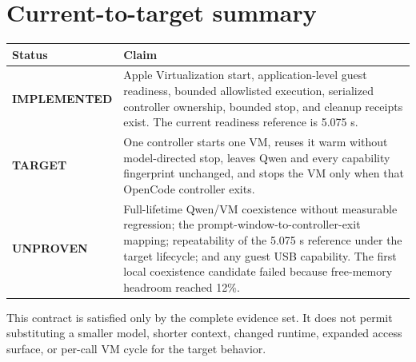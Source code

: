 \documentclass[10pt]{article}
\newcommand{\Implemented}{\textcolor{implemented}{\textbf{IMPLEMENTED}}}
\newcommand{\Target}{\textcolor{target}{\textbf{TARGET}}}
\newcommand{\Unproven}{\textcolor{unproven}{\textbf{UNPROVEN}}}
\begin{document}
\section{Current-to-target summary}

\begin{center}
\begin{tabularx}{\linewidth}{@{}l X@{}}
\toprule
Status & Claim \\
\midrule
\Implemented & Apple Virtualization start, application-level guest readiness,
bounded allowlisted execution, serialized controller ownership, bounded stop,
and cleanup receipts exist.  The current readiness reference is 5.075 s. \\
\Target & One controller starts one VM, reuses it warm without model-directed
stop, leaves Qwen and every capability fingerprint unchanged, and stops the VM
only when that OpenCode controller exits. \\
\Unproven & Full-lifetime Qwen/VM coexistence without measurable regression;
the prompt-window-to-controller-exit mapping; repeatability of the 5.075 s
reference under the target lifecycle; and any guest USB capability.  The first
local coexistence candidate failed because free-memory headroom reached 12\%. \\
\bottomrule
\end{tabularx}
\end{center}

This contract is satisfied only by the complete evidence set.  It does not
permit substituting a smaller model, shorter context, changed runtime, expanded
access surface, or per-call VM cycle for the target behavior.
\end{document}
